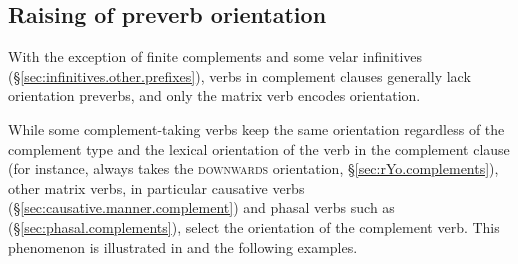 \subsection{Raising of preverb orientation} \label{sec:orientation.raising}
With the exception of finite complements and some velar infinitives (§\ref{sec:infinitives.other.prefixes}), verbs in complement clauses generally lack orientation preverbs, and only the matrix verb encodes orientation.

While some com\-ple\-ment-taking verbs keep the same orientation regardless of the complement type and the lexical orientation of the verb in the complement clause (for instance,  always takes the \textsc{downwards} orientation, §\ref{sec:rYo.complements}), other matrix verbs, in particular causative verbs (§\ref{sec:causative.manner.complement}) and phasal verbs such as    (§\ref{sec:phasal.complements}), select the orientation of the complement verb. This phenomenon is illustrated in  and the following examples.


